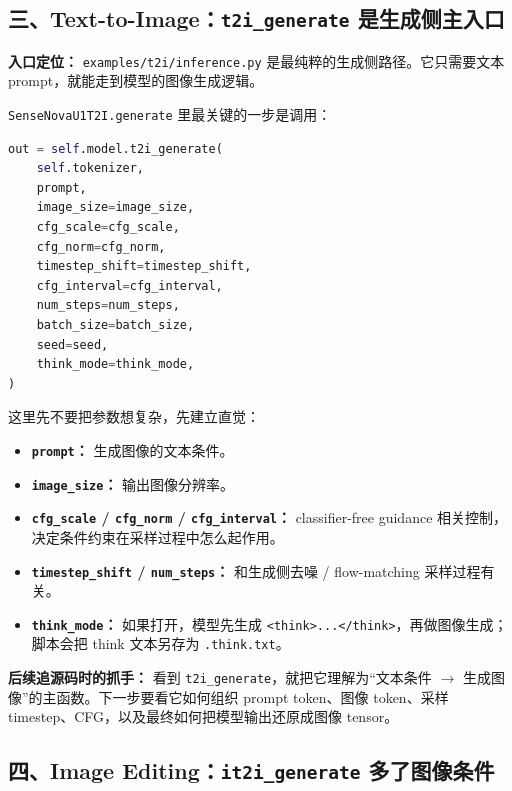 \subsection{三、Text-to-Image：\texttt{t2i\_generate} 是生成侧主入口}

\begin{conceptbox}
\textbf{入口定位：} \texttt{examples/t2i/inference.py} 是最纯粹的生成侧路径。它只需要文本 prompt，就能走到模型的图像生成逻辑。
\end{conceptbox}

\texttt{SenseNovaU1T2I.generate} 里最关键的一步是调用：

\begin{lstlisting}[language=Python]
out = self.model.t2i_generate(
    self.tokenizer,
    prompt,
    image_size=image_size,
    cfg_scale=cfg_scale,
    cfg_norm=cfg_norm,
    timestep_shift=timestep_shift,
    cfg_interval=cfg_interval,
    num_steps=num_steps,
    batch_size=batch_size,
    seed=seed,
    think_mode=think_mode,
)
\end{lstlisting}

这里先不要把参数想复杂，先建立直觉：

\begin{itemize}[leftmargin=1.5em]
  \item \textbf{\texttt{prompt}：} 生成图像的文本条件。
  \item \textbf{\texttt{image\_size}：} 输出图像分辨率。
  \item \textbf{\texttt{cfg\_scale} / \texttt{cfg\_norm} / \texttt{cfg\_interval}：} classifier-free guidance 相关控制，决定条件约束在采样过程中怎么起作用。
  \item \textbf{\texttt{timestep\_shift} / \texttt{num\_steps}：} 和生成侧去噪 / flow-matching 采样过程有关。
  \item \textbf{\texttt{think\_mode}：} 如果打开，模型先生成 \texttt{<think>...</think>}，再做图像生成；脚本会把 think 文本另存为 \texttt{.think.txt}。
\end{itemize}

\begin{intubox}
\textbf{后续追源码时的抓手：} 看到 \texttt{t2i\_generate}，就把它理解为“文本条件 \(\rightarrow\) 生成图像”的主函数。下一步要看它如何组织 prompt token、图像 token、采样 timestep、CFG，以及最终如何把模型输出还原成图像 tensor。
\end{intubox}

\subsection{四、Image Editing：\texttt{it2i\_generate} 多了图像条件}

